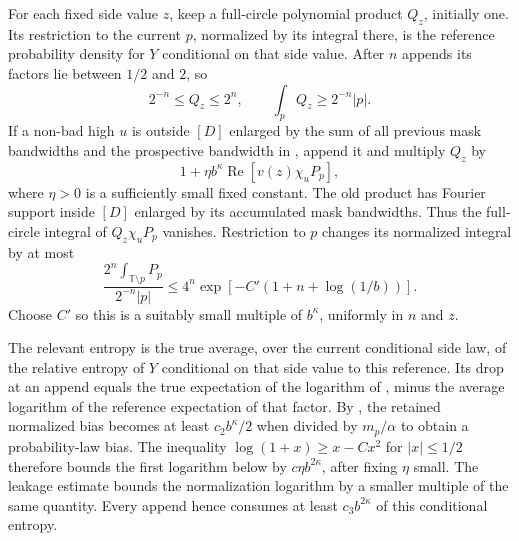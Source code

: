 For each fixed side value $z$, keep a full-circle polynomial product $Q_z$,
initially one. Its restriction to the current $p$, normalized by its
integral there, is the reference probability density for $Y$ conditional on
that side value. After $n$ appends its factors lie between $1/2$ and $2$,
so
\[
 2^{-n}\le Q_z\le2^n,\qquad \int_pQ_z\ge2^{-n}|p|.
\]
If a non-bad high $u$ is outside $[D]$ enlarged by the sum of all previous
mask bandwidths and the prospective bandwidth in
, append it and multiply $Q_z$ by
\begin{equation}\label{eq:07-product-factor}
 1+\eta b^\kappa\operatorname{Re}[v(z)\chi_u P_p],
\end{equation}
where $\eta>0$ is a sufficiently small fixed constant. The old product has
Fourier support inside $[D]$ enlarged by its accumulated mask bandwidths.
Thus the full-circle integral of $Q_z\chi_u P_p$ vanishes. Restriction to
$p$ changes its normalized integral by at most
\[
 \frac{2^n\int_{\mathbb T\setminus p}P_p}{2^{-n}|p|}
 \le4^n\exp[-C'(1+n+\log(1/b))].
\]
Choose $C'$ so this is a suitably small multiple of $b^\kappa$, uniformly
in $n$ and $z$.

The relevant entropy is the true average, over the current conditional side
law, of the relative entropy of $Y$ conditional on that side value to this
reference. Its drop at an append equals the true expectation of the
logarithm of , minus the average logarithm of
the reference expectation of that factor. By
, the retained normalized bias becomes at least
$c_2b^\kappa/2$ when divided by $m_p/\alpha$ to obtain a probability-law
bias. The inequality $\log(1+x)\ge x-Cx^2$ for $|x|\le1/2$ therefore
bounds the first logarithm below by $c\eta b^{2\kappa}$, after fixing
$\eta$ small. The leakage estimate bounds the normalization logarithm by
a smaller multiple of the same quantity. Every append hence consumes at
least $c_3b^{2\kappa}$ of this conditional entropy.

